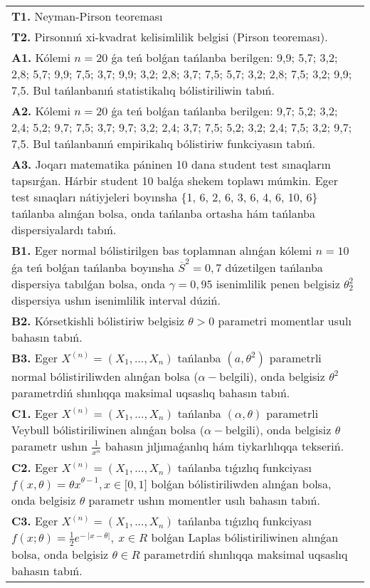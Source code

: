 \documentclass{article}
\begin{document}
\begin{tabular}{m{17cm}}
\textbf{T1.} 
Neyman-Pirson teoreması
 \\
\textbf{T2.} 
Pirsonnıń xi-kvadrat kelisimlilik belgisi (Pirson teoreması).
 \\
\textbf{A1.} 
Kólemi \(n = 20\) ǵa teń bolǵan tańlanba berilgen: 9,9; 5,7; 3,2; 2,8; 5,7; 9,9; 7,5; 3,7; 9,9; 3,2; 2,8; 3,7; 7,5; 5,7; 3,2; 2,8; 7,5; 3,2; 9,9; 7,5. Bul tańlanbanıń statistikalıq bólistiriliwin tabıń.
 \\
\textbf{A2.} 
Kólemi \(n = 20\) ǵa teń bolǵan tańlanba berilgen: 9,7; 5,2; 3,2; 2,4; 5,2; 9,7; 7,5; 3,7; 9,7; 3,2; 2,4; 3,7; 7,5; 5,2; 3,2; 2,4; 7,5; 3,2; 9,7; 7,5. Bul tańlanbanıń empirikalıq bólistiriw funkciyasın tabıń.
 \\
\textbf{A3.} 
Joqarı matematika páninen 10 dana student test sınaqların tapsırǵan. Hárbir student 10 balǵa shekem toplawı múmkin. Eger test sınaqları nátiyjeleri boyınsha \{1, 6, 2, 6, 3, 6, 4, 6, 10, 6\} tańlanba alınǵan bolsa, onda tańlanba ortasha hám tańlanba dispersiyalardı tabıń.
 \\
\textbf{B1.} 
Eger normal bólistirilgen bas toplamnan alınǵan kólemi \(n = 10\) ǵa teń bolǵan tańlanba boyınsha \({\overline{S}}^{2} = 0,7\) dúzetilgen tańlanba dispersiya tabılǵan bolsa, onda \(\gamma = 0,95\) isenimlilik penen belgisiz \(\theta_{2}^{2}\) dispersiya ushın isenimlilik interval dúziń.
 \\
\textbf{B2.} 
Kórsetkishli bólistiriw belgisiz \(\theta > 0\) parametri momentlar usulı bahasın tabıń.
 \\
\textbf{B3.} 
Eger \(X^{(n)} = \left( X_{1},...,X_{n} \right)\) tańlanba \(\left( a,\theta^{2} \right)\) parametrli normal bólistiriliwden alınǵan bolsa (\(\alpha -\)belgili), onda belgisiz \(\theta^{2}\) parametrdiń shınlıqqa maksimal uqsaslıq bahasın tabıń.
 \\
\textbf{C1.} 
Eger \(X^{(n)} = \left( X_{1},...,X_{n} \right)\) tańlanba \((\alpha,\theta)\) parametrli Veybull bólistiriliwinen alınǵan bolsa (\(\alpha -\)belgili), onda belgisiz \(\theta\) parametr ushın \(\frac{1}{\overline{x^{\alpha}}}\) bahasın jıljımaǵanlıq hám tiykarlılıqqa tekseriń.
 \\
\textbf{C2.} 
Eger \(X^{(n)} = \left( X_{1},...,X_{n} \right)\) tańlanba tıǵızlıq funkciyası
${f(x,\theta) = \theta x}^{\theta - 1},x \in \lbrack 0,1\rbrack$
bolǵan bólistiriliwden alınǵan bolsa, onda belgisiz \(\theta\) parametr ushın momentler usılı bahasın tabıń.
 \\
\textbf{C3.} 
Eger \(X^{(n)} = \left( X_{1},...,X_{n} \right)\) tańlanba tıǵızlıq funkciyası
$f(x;\theta) = \frac{1}{2}e^{- \ |x - \theta|},\ x \in R$
bolǵan Laplas bólistiriliwinen alınǵan bolsa, onda belgisiz \(\theta \in R\) parametrdiń shınlıqqa maksimal uqsaslıq bahasın tabıń.
 \\

\end{tabular}
\vspace{1cm}
\end{document}

